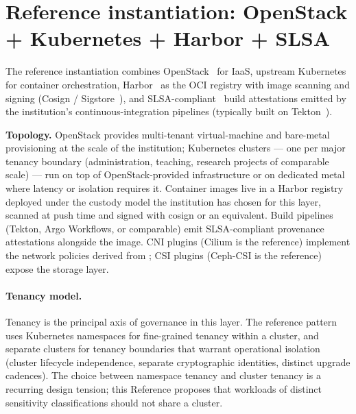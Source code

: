 \section{Reference instantiation: OpenStack + Kubernetes + Harbor + SLSA}
\label{sec:co-reference}

The reference instantiation combines OpenStack~\cite{openstack} for
IaaS, upstream Kubernetes~\cite{kubernetes} for container
orchestration, Harbor~\cite{harbor} as the OCI registry with image
scanning and signing (Cosign / Sigstore~\cite{sigstore}), and
SLSA-compliant~\cite{slsa-spec} build attestations emitted by the
institution's continuous-integration pipelines (typically built on
Tekton~\cite{tekton}).

\begin{instantiationbox}
\noindent\textbf{Topology.} OpenStack provides multi-tenant
virtual-machine and bare-metal provisioning at the scale of the
institution; Kubernetes clusters --- one per major tenancy boundary
(administration, teaching, research projects of comparable scale) ---
run on top of OpenStack-provided infrastructure or on dedicated
metal where latency or isolation requires it. Container images live
in a Harbor registry deployed under the custody model the
institution has chosen for this layer, scanned at push time and
signed with cosign or an equivalent. Build pipelines (Tekton, Argo
Workflows, or comparable) emit SLSA-compliant provenance
attestations alongside the image. CNI plugins (Cilium is the
reference) implement the network policies derived from
; CSI plugins (Ceph-CSI is the reference)
expose the storage layer.
\end{instantiationbox}

\paragraph{Tenancy model.} Tenancy is the principal axis of
governance in this layer. The reference pattern uses Kubernetes
namespaces for fine-grained tenancy within a cluster, and separate
clusters for tenancy boundaries that warrant operational isolation
(cluster lifecycle independence, separate cryptographic identities,
distinct upgrade cadences). The choice between namespace tenancy
and cluster tenancy is a recurring design tension; this Reference
proposes that workloads of distinct sensitivity classifications
should not share a cluster.


